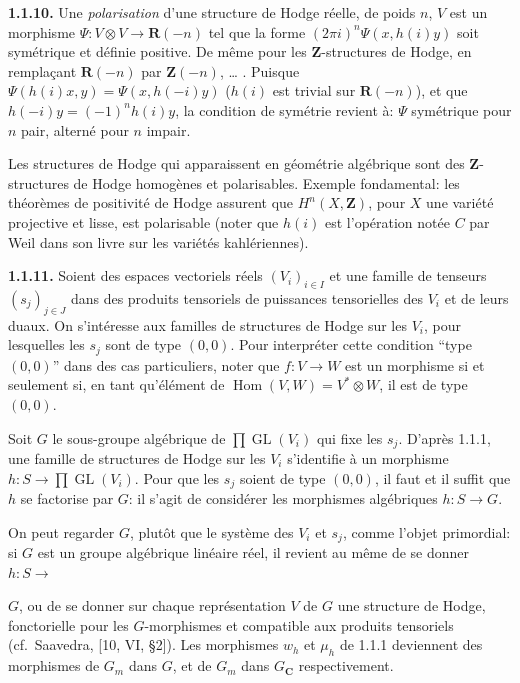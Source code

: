 \documentclass[10pt,a4paper]{article}
\newcommand{\SourcePage}[2]{\clearpage\setcounter{page}{#2}\typeout{D031_SOURCE_PAGE physical=#1 printed=#2}}
\begin{document}
\textbf{1.1.10.} Une \emph{polarisation} d'une structure de Hodge réelle, de poids \(n\), \(V\) est un morphisme \(\Psi:V\otimes V\to\mathbf R(-n)\) tel que la forme \((2\pi i)^n\Psi(x,h(i)y)\) soit symétrique et définie positive. De même pour les \(\mathbf Z\)-structures de Hodge, en remplaçant \(\mathbf R(-n)\) par \(\mathbf Z(-n)\), \ldots{} . Puisque \(\Psi(h(i)x,y)=\Psi(x,h(-i)y)\) (\(h(i)\) est trivial sur \(\mathbf R(-n)\)), et que \(h(-i)y=(-1)^nh(i)y\), la condition de symétrie revient à: \(\Psi\) symétrique pour \(n\) pair, alterné pour \(n\) impair.

Les structures de Hodge qui apparaissent en géométrie algébrique sont des \(\mathbf Z\)-structures de Hodge homogènes et polarisables. Exemple fondamental: les théorèmes de positivité de Hodge assurent que \(H^n(X,\mathbf Z)\), pour \(X\) une variété projective et lisse, est polarisable (noter que \(h(i)\) est l'opération notée \(C\) par Weil dans son livre sur les variétés kahlériennes).

\textbf{1.1.11.} Soient des espaces vectoriels réels \((V_i)_{i\in I}\) et une famille de tenseurs \((s_j)_{j\in J}\) dans des produits tensoriels de puissances tensorielles des \(V_i\) et de leurs duaux. On s'intéresse aux familles de structures de Hodge sur les \(V_i\), pour lesquelles les \(s_j\) sont de type \((0,0)\). Pour interpréter cette condition ``type \((0,0)\)'' dans des cas particuliers, noter que \(f:V\to W\) est un morphisme si et seulement si, en tant qu'élément de \(\operatorname{Hom}(V,W)=V^*\otimes W\), il est de type \((0,0)\).

Soit \(G\) le sous-groupe algébrique de \(\prod\operatorname{GL}(V_i)\) qui fixe les \(s_j\). D'après 1.1.1, une famille de structures de Hodge sur les \(V_i\) s'identifie à un morphisme \(h:S\to\prod\operatorname{GL}(V_i)\). Pour que les \(s_j\) soient de type \((0,0)\), il faut et il suffit que \(h\) se factorise par \(G\): il s'agit de considérer les morphismes algébriques \(h:S\to G\).

On peut regarder \(G\), plutôt que le système des \(V_i\) et \(s_j\), comme l'objet primordial: si \(G\) est un groupe algébrique linéaire réel, il revient au même de se donner \(h:S\to\)

\SourcePage{8}{254}
\(G\), ou de se donner sur chaque représentation \(V\) de \(G\) une structure de Hodge, fonctorielle pour les \(G\)-morphismes et compatible aux produits tensoriels (cf.~Saavedra, {[}10, VI, §2{]}). Les morphismes \(w_h\) et \(\mu_h\) de 1.1.1 deviennent des morphismes de \(G_m\) dans \(G\), et de \(G_m\) dans \(G_{\mathbf C}\) respectivement.
\end{document}
